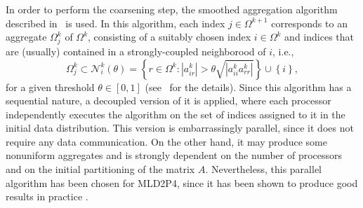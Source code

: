 In order to perform the coarsening step, the smoothed aggregation algorithm
described in~\cite{VANEK_MANDEL_BREZINA} is used. In this algorithm,
each index $j \in \Omega^{k+1}$ corresponds to an aggregate $\Omega^k_j$ of $\Omega^k$,
consisting of a suitably chosen index $i \in \Omega^k$ and indices that are (usually) contained in a
strongly-coupled neighborood of $i$, i.e.,
\begin{equation}
\label{eq:strongly_coup}
   \Omega^k_j \subset \mathcal{N}_i^k(\theta) = 
   \left\{ r \in \Omega^k: |a_{ir}^k| > \theta \sqrt{|a_{ii}^ka_{rr}^k|} \right \} \cup \left\{ i \right\},
\end{equation}
for a given threshold $\theta \in [0,1]$ (see~\cite{VANEK_MANDEL_BREZINA} for the details).
Since this algorithm has a sequential nature, a decoupled
version of it is applied, where each processor independently executes
the algorithm on the set of indices assigned to it in the initial data
distribution. This version is embarrassingly parallel, since it does not require any data 
communication. On the other hand, it may produce some nonuniform aggregates
and is strongly dependent on the number of processors and on the initial partitioning
of the matrix $A$. Nevertheless, this parallel algorithm has been chosen for
MLD2P4, since it has been shown to produce good results in practice
\cite{aaecc_07,apnum_07,TUMINARO_TONG}.


